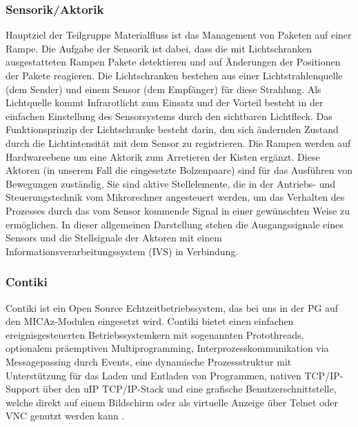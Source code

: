 \subsubsection{Sensorik/Aktorik}
Hauptziel der Teilgruppe Materialfluss ist das Management von Paketen auf einer Rampe.
Die Aufgabe der Sensorik ist dabei, dass die mit Lichtschranken ausgestatteten Rampen Pakete detektieren und auf \"Anderungen der Positionen der Pakete reagieren.
Die Lichtschranken bestehen aus einer Lichtstrahlenquelle (dem Sender) und einem Sensor (dem Empf\"anger) f\"{u}r diese Strahlung.
Als Lichtquelle kommt Infrarotlicht zum Einsatz und der Vorteil besteht in der einfachen Einstellung des Sensorsystems durch den
sichtbaren Lichtfleck. Das Funktionsprinzip der Lichtschranke besteht darin, den sich  \"andernden Zustand durch die Lichtintensit\"at mit dem Sensor zu registrieren. 
Die Rampen werden auf Hardwareebene um eine Aktorik zum Arretieren der Kisten erg\"anzt. Diese Aktoren (in unserem Fall die
eingesetzte Bolzenpaare) sind f\"ur das Ausf\"uhren von Bewegungen zust\"andig.
Sie sind aktive Stellelemente, die in der Antriebs- und Steuerungstechnik vom  Mikrorechner angesteuert werden, um das Verhalten des Prozesses durch das vom Sensor kommende Signal in einer gew\"{u}nschten Weise zu erm\"oglichen. In dieser allgemeinen Darstellung stehen die 
Ausgangssignale eines Sensors und die Stellsignale der Aktoren mit einem
Informationsverarbeitungssystem (IVS) in Verbindung.

\subsubsection{Contiki}
Contiki ist ein Open Source Echtzeitbetriebssystem, das bei uns in der PG auf den MICAz-Modulen eingesetzt wird.
Contiki bietet einen einfachen ereignisgesteuerten Betriebssystemkern mit sogenannten Protothreads, optionalem 
pr\"aemptiven Multiprogramming, Interprozesskommunikation via Messagepassing durch Events, eine dynamische Prozessstruktur
mit Unterst\"utzung f\"ur das Laden und Entladen von Programmen, nativen TCP/IP-Support über den uIP TCP/IP-Stack und eine 
grafische Benutzerschnittstelle, welche direkt auf einem Bildschirm oder als virtuelle Anzeige \"uber Telnet oder VNC genutzt werden kann \cite{Wikipedia:2013:Online}.
 
